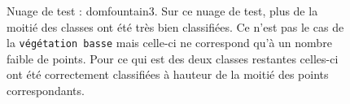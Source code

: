 \documentclass[a4paper, onecolumn, 11pt]{article}
\begin{document}
\begin{figure}[h]
    \caption{Nuage de test : domfountain3. Sur ce nuage de test, plus de la moitié des classes ont été très bien classifiées. Ce n'est pas le cas de la \texttt{végétation basse} mais celle-ci ne correspond qu'à un nombre faible de points. Pour ce qui est des deux classes restantes celles-ci ont été correctement classifiées à hauteur de la moitié des points correspondants.}
    \label{fig:domfountain3}
\end{figure}

\begin{figure}[h]
    \centering
    \qquad
    \qquad

\end{figure}
\end{document}
